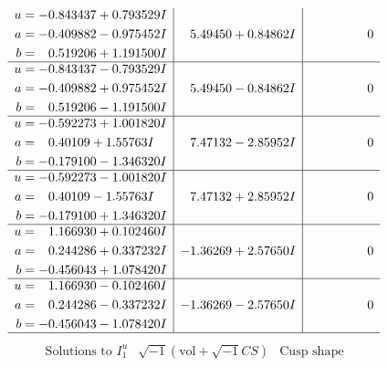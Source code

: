 \documentclass[1p]{elsarticle_modified}
\theoremstyle{definition}
\newcommand{\I}{\sqrt{-1}}
\begin{document}
$$\begin{array}{c|c|c}
\begin{aligned}
u &= -0.843437 + 0.793529 I \\
a &= -0.409882 - 0.975452 I \\
b &= \phantom{-}0.519206 + 1.191500 I\end{aligned}
 & \phantom{-}5.49450 + 0.84862 I & \phantom{-0.000000 } 0 \\ \hline\begin{aligned}
u &= -0.843437 - 0.793529 I \\
a &= -0.409882 + 0.975452 I \\
b &= \phantom{-}0.519206 - 1.191500 I\end{aligned}
 & \phantom{-}5.49450 - 0.84862 I & \phantom{-0.000000 } 0 \\ \hline\begin{aligned}
u &= -0.592273 + 1.001820 I \\
a &= \phantom{-}0.40109 + 1.55763 I \\
b &= -0.179100 - 1.346320 I\end{aligned}
 & \phantom{-}7.47132 - 2.85952 I & \phantom{-0.000000 } 0 \\ \hline\begin{aligned}
u &= -0.592273 - 1.001820 I \\
a &= \phantom{-}0.40109 - 1.55763 I \\
b &= -0.179100 + 1.346320 I\end{aligned}
 & \phantom{-}7.47132 + 2.85952 I & \phantom{-0.000000 } 0 \\ \hline\begin{aligned}
u &= \phantom{-}1.166930 + 0.102460 I \\
a &= \phantom{-}0.244286 + 0.337232 I \\
b &= -0.456043 + 1.078420 I\end{aligned}
 & -1.36269 + 2.57650 I & \phantom{-0.000000 } 0 \\ \hline\begin{aligned}
u &= \phantom{-}1.166930 - 0.102460 I \\
a &= \phantom{-}0.244286 - 0.337232 I \\
b &= -0.456043 - 1.078420 I\end{aligned}
 & -1.36269 - 2.57650 I & \phantom{-0.000000 } 0\\
 \hline 
 \end{array}$$\newpage$$\begin{array}{c|c|c}  
\text{Solutions to }I^u_{1}& \I (\text{vol} + \sqrt{-1}CS) & \text{Cusp shape}\\
 \hline 
\begin{aligned}

\end{aligned}
\end{array}$$
\end{document}
